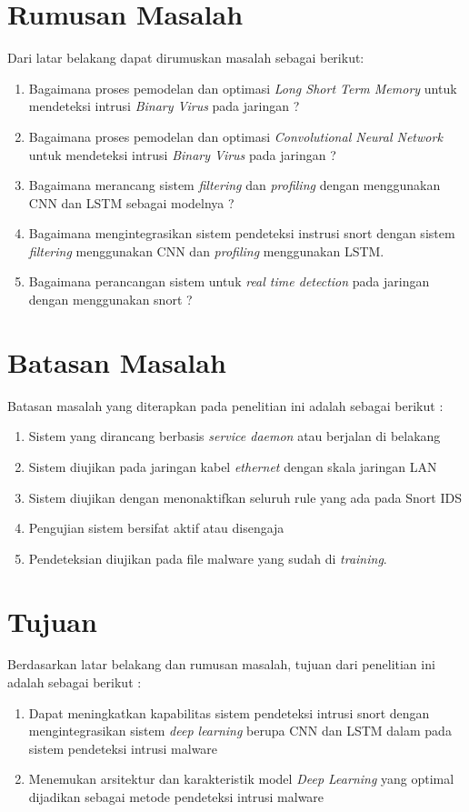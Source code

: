 \documentclass[skripsi.tex]{subfiles}
\begin{document}
\section{Rumusan Masalah} \label{rumusanmasalah}
Dari latar belakang dapat dirumuskan masalah sebagai berikut:
\begin{enumerate}
    \item Bagaimana proses pemodelan dan optimasi \textit{Long Short Term Memory} untuk mendeteksi intrusi \textit{Binary Virus} pada jaringan ?
    \item Bagaimana proses pemodelan dan optimasi \textit{Convolutional Neural Network} untuk mendeteksi intrusi \textit{Binary Virus} pada jaringan ?
    \item Bagaimana merancang sistem \textit{filtering} dan \textit{profiling} dengan menggunakan CNN dan LSTM sebagai modelnya ?
    \item Bagaimana mengintegrasikan sistem pendeteksi instrusi snort dengan sistem \textit{filtering} menggunakan CNN dan \textit{profiling} menggunakan LSTM.
    \item Bagaimana perancangan sistem untuk \textit{real time detection} pada jaringan dengan menggunakan snort ?
\end{enumerate}
\section{Batasan Masalah} \label{batasanmasalah}
Batasan masalah yang diterapkan pada penelitian ini adalah sebagai berikut :
\begin{enumerate}
    \item Sistem yang dirancang berbasis \textit{service daemon} atau berjalan di belakang
    \item Sistem diujikan pada jaringan kabel \textit{ethernet} dengan skala jaringan LAN
    \item Sistem diujikan dengan menonaktifkan seluruh rule yang ada pada Snort IDS
    \item Pengujian sistem bersifat aktif atau disengaja
    \item Pendeteksian diujikan pada file malware yang sudah di \textit{training}.
\end{enumerate}
\section{Tujuan}
Berdasarkan latar belakang dan rumusan masalah, tujuan dari penelitian ini adalah sebagai berikut :
\begin{enumerate}
    \item Dapat meningkatkan kapabilitas sistem pendeteksi intrusi snort dengan mengintegrasikan sistem \textit{deep learning} berupa CNN dan LSTM dalam pada sistem pendeteksi intrusi malware
    \item Menemukan arsitektur dan karakteristik model \textit{Deep Learning} yang optimal dijadikan sebagai metode pendeteksi intrusi malware
\end{enumerate}
\end{document}

